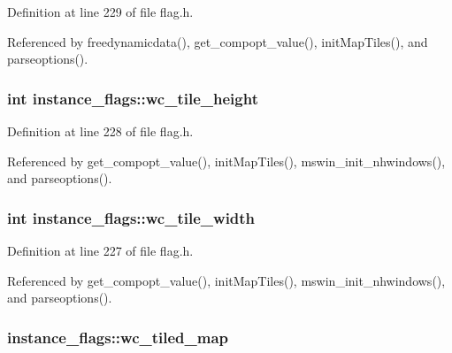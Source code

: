 Definition at line 229 of file flag.\+h.



Referenced by freedynamicdata(), get\+\_\+compopt\+\_\+value(), init\+Map\+Tiles(), and parseoptions().

\hypertarget{structinstance__flags_ac52623febbb46475512c5b3e1cb1d3d7}{
\subsubsection[{wc\+\_\+tile\+\_\+height}]{\setlength{\rightskip}{0pt plus 5cm}int instance\+\_\+flags\+::wc\+\_\+tile\+\_\+height}}\label{structinstance__flags_ac52623febbb46475512c5b3e1cb1d3d7}


Definition at line 228 of file flag.\+h.



Referenced by get\+\_\+compopt\+\_\+value(), init\+Map\+Tiles(), mswin\+\_\+init\+\_\+nhwindows(), and parseoptions().

\hypertarget{structinstance__flags_a4be58c92f2e9fdc0f00c32655fa9ec2c}{
\subsubsection[{wc\+\_\+tile\+\_\+width}]{\setlength{\rightskip}{0pt plus 5cm}int instance\+\_\+flags\+::wc\+\_\+tile\+\_\+width}}\label{structinstance__flags_a4be58c92f2e9fdc0f00c32655fa9ec2c}


Definition at line 227 of file flag.\+h.



Referenced by get\+\_\+compopt\+\_\+value(), init\+Map\+Tiles(), mswin\+\_\+init\+\_\+nhwindows(), and parseoptions().

\hypertarget{structinstance__flags_a02c7a985641832cea88ec0586bff04db}{
\subsubsection[{wc\+\_\+tiled\+\_\+map}]{ instance\+\_\+flags\+::wc\+\_\+tiled\+\_\+map}}\label{structinstance__flags_a02c7a985641832cea88ec0586bff04db}


